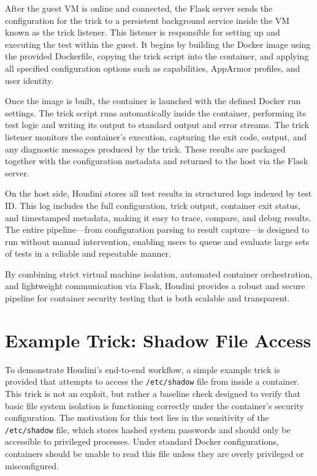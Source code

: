 \documentclass[12pt]{report}
\begin{document}
\begin{doublespace}
After the guest VM is online and connected, the Flask server sends the configuration for the trick to a persistent background service inside the VM known as the trick listener. This listener is responsible for setting up and executing the test within the guest. It begins by building the Docker image using the provided Dockerfile, copying the trick script into the container, and applying all specified configuration options such as capabilities, AppArmor profiles, and user identity.

Once the image is built, the container is launched with the defined Docker run settings. The trick script runs automatically inside the container, performing its test logic and writing its output to standard output and error streams. The trick listener monitors the container’s execution, capturing the exit code, output, and any diagnostic messages produced by the trick. These results are packaged together with the configuration metadata and returned to the host via the Flask server.

On the host side, Houdini stores all test results in structured logs indexed by test ID. This log includes the full configuration, trick output, container exit status, and timestamped metadata, making it easy to trace, compare, and debug results. The entire pipeline—from configuration parsing to result capture—is designed to run without manual intervention, enabling users to queue and evaluate large sets of tests in a reliable and repeatable manner.

By combining strict virtual machine isolation, automated container orchestration, and lightweight communication via Flask, Houdini provides a robust and secure pipeline for container security testing that is both scalable and transparent.


\section{Example Trick: Shadow File Access}

To demonstrate Houdini’s end-to-end workflow, a simple example trick is provided that attempts to access the \texttt{/etc/shadow} file from inside a container. This trick is not an exploit, but rather a baseline check designed to verify that basic file system isolation is functioning correctly under the container’s security configuration. The motivation for this test lies in the sensitivity of the \texttt{/etc/shadow} file, which stores hashed system passwords and should only be accessible to privileged processes. Under standard Docker configurations, containers should be unable to read this file unless they are overly privileged or misconfigured.


\end{doublespace}
\end{document}
